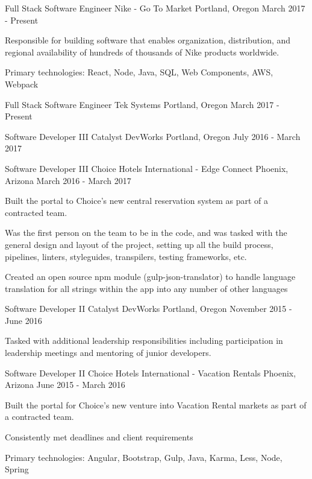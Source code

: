 
\begin{cventries}

  \cventry
  {Full Stack Software Engineer}
  {Nike - Go To Market}
  {Portland, Oregon}
  {March 2017 - Present}
  {
    \begin{cvitems}
      \item {Responsible for building software that enables organization, distribution, and regional availability of hundreds of thousands of Nike products worldwide.}
      \item {Primary technologies: React, Node, Java, SQL, Web Components, AWS, Webpack}
    \end{cvitems}
  }

  \cventry
  {Full Stack Software Engineer}
  {Tek Systems}
  {Portland, Oregon}
  {March 2017 - Present}
  {}

  \cventry
  {Software Developer III}
  {Catalyst DevWorks}
  {Portland, Oregon}
  {July 2016 - March 2017}
  {}

  \cventry
    {Software Developer III}
    {Choice Hotels International - Edge Connect}
    {Phoenix, Arizona}
    {March 2016 - March 2017}
    {
      \begin{cvitems}
        \item {Built the portal to Choice's new central reservation system as part of a contracted team.}
        \item {Was the first person on the team to be in the code, and was tasked with the general design and layout of the project, setting up all the build process, pipelines, linters, styleguides, transpilers, testing frameworks, etc.}
        \item {Created an open source npm module (gulp-json-translator) to handle language translation for all strings within the app into any number of other languages}
      \end{cvitems}
    }

  \cventry
    {Software Developer II}
    {Catalyst DevWorks}
    {Portland, Oregon}
    {November 2015 - June 2016}
    {
      \begin{cvitems}
        \item {Tasked with additional leadership responsibilities including participation in leadership meetings and mentoring of junior developers.}
      \end{cvitems}
    }

  \cventry
    {Software Developer II}
    {Choice Hotels International - Vacation Rentals}
    {Phoenix, Arizona}
    {June 2015 - March 2016}
    {
      \begin{cvitems}
        \item {Built the portal for Choice's new venture into Vacation Rental markets as part of a contracted team.}
        \item {Consistently met deadlines and client requirements}
        \item {Primary technologies: Angular, Bootstrap, Gulp, Java, Karma, Less, Node, Spring}
      \end{cvitems}
    }


\end{cventries}
